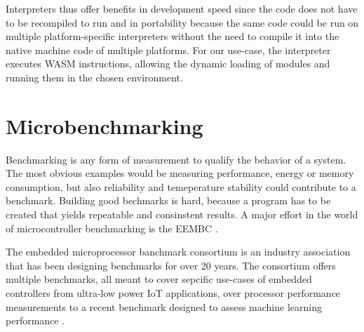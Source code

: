 Interpreters thus offer benefits in development speed since the code does not have to be recompiled to run and in portability because the same code could be run on multiple platform-specific interpreters without the need to compile it into the native machine code of multiple platforms. For our use-case, the interpreter executes WASM instructions, allowing the dynamic loading of modules and running them in the chosen environment.

\section{Microbenchmarking}

Benchmarking is any form of measurement to qualify the behavior of a system. The most obvious examples would be measuring performance, energy or memory consumption, but also reliability and temeperature stability could contribute to a benchmark. Building good bechmarks is hard, because a program has to be created that yields repeatable and consinstent results. A major effort in the world of microcontroller benchmarking is the EEMBC \autocite{noauthor_embedded_nodate}.

The embedded microprocessor banchmark consortium is an industry association that has been designing benchmarks for over 20 years. The consortium offers multiple benchmarks, all meant to cover sepcific use-cases of embedded controllers from ultra-low power IoT applications, over processor performance measurements to a recent benchmark designed to assess machine learning performance \autocite{noauthor_benchmark_nodate}.